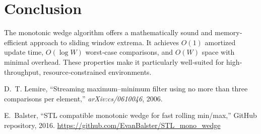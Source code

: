 \documentclass[12pt,letterpaper]{article}
\begin{document}
\section{Conclusion}
The monotonic wedge algorithm offers a mathematically sound and memory‐efficient approach to sliding window extrema.  It achieves \(O(1)\) amortized update time, \(O(\log W)\) worst‐case comparisons, and \(O(W)\) space with minimal overhead.  These properties make it particularly well‐suited for high‐throughput, resource‐constrained environments.

\begin{thebibliography}{9}
D.~T. Lemire, “Streaming maximum–minimum filter using no more than three comparisons per element,” \emph{arXiv:cs/0610046}, 2006.

E.~Balster, “STL compatible monotonic wedge for fast rolling min/max,” GitHub repository, 2016. \url{https://github.com/EvanBalster/STL_mono_wedge}
\end{thebibliography}
\end{document}
